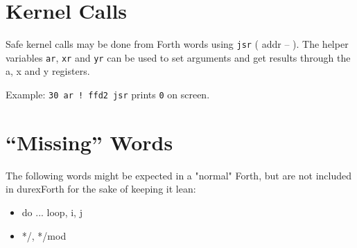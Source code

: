 \section{Kernel Calls}

Safe kernel calls may be done from Forth words using \texttt{jsr} ( addr -- ). The helper variables \texttt{ar}, \texttt{xr} and \texttt{yr} can be used to set arguments and get results through the a, x and y registers.

Example: \texttt{30 ar ! ffd2 jsr} prints \texttt{0} on screen.

\section{``Missing'' Words}

The following words might be expected in a "normal" Forth, but are not included in durexForth for the sake of keeping it lean:

\begin{itemize}
\item do ... loop, i, j
\item */, */mod
\end{itemize}

